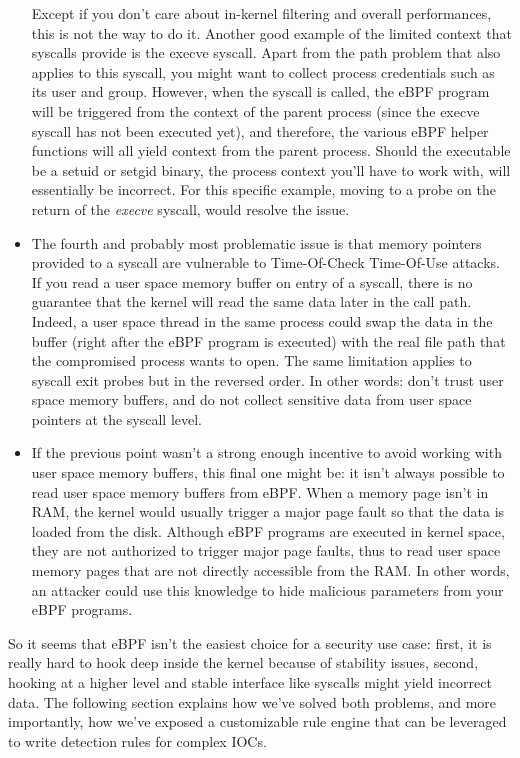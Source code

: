 \begin{itemize}
  Except if you don’t care about in-kernel filtering and overall performances, this is not the way to do it.
  Another good example of the limited context that syscalls provide is the execve syscall.
  Apart from the path problem that also applies to this syscall, you might want to collect process credentials such as its user and group.
  However, when the syscall is called, the eBPF program will be triggered from the context of the parent process (since the execve syscall has not been executed yet), and therefore, the various eBPF helper functions will all yield context from the parent process.
  Should the executable be a setuid or setgid binary, the process context you’ll have to work with, will essentially be incorrect.
  For this specific example, moving to a probe on the return of the \emph{execve} syscall, would resolve the issue.
  \item The fourth and probably most problematic issue is that memory pointers provided to a syscall are vulnerable to Time-Of-Check Time-Of-Use attacks.
  If you read a user space memory buffer on entry of a syscall, there is no guarantee that the kernel will read the same data later in the call path.
  Indeed, a user space thread in the same process could swap the data in the buffer (right after the eBPF program is executed) with the real file path that the compromised process wants to open.
  The same limitation applies to syscall exit probes but in the reversed order.
  In other words: don't trust user space memory buffers, and do not collect sensitive data from user space pointers at the syscall level.
  \item If the previous point wasn't a strong enough incentive to avoid working with user space memory buffers, this final one might be: it isn't always possible to read user space memory buffers from eBPF.
  When a memory page isn't in RAM, the kernel would usually trigger a major page fault so that the data is loaded from the disk.
  Although eBPF programs are executed in kernel space, they are not authorized to trigger major page faults, thus to read user space memory pages that are not directly accessible from the RAM.
  In other words, an attacker could use this knowledge to hide malicious parameters from your eBPF programs.
\end{itemize}

So it seems that eBPF isn’t the easiest choice for a security use case: first, it is really hard to hook deep inside the kernel because of stability issues, second, hooking at a higher level and stable interface like syscalls might yield incorrect data.
The following section explains how we’ve solved both problems, and more importantly, how we’ve exposed a customizable rule engine that can be leveraged to write detection rules for complex IOCs.

